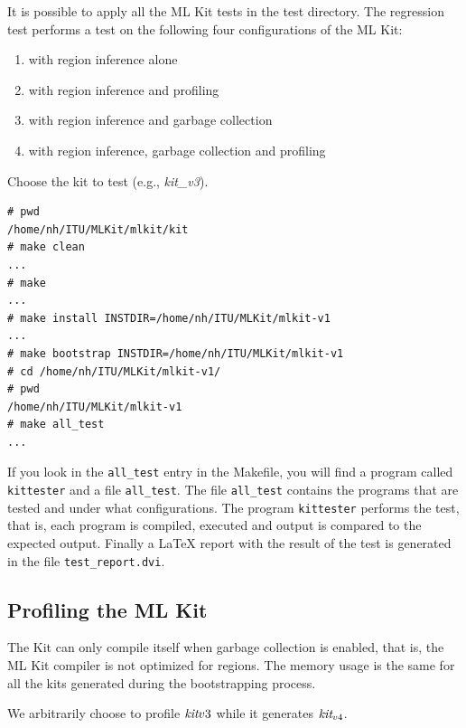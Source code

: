 \documentclass[12pt]{book}
\begin{document}
It is possible to apply all the ML Kit tests in the test directory.
The regression test performs a test on the following four
configurations of the ML Kit:

\begin{enumerate}
\item with region inference alone
\item with region inference and profiling
\item with region inference and garbage collection
\item with region inference, garbage collection and profiling
\end{enumerate}

Choose the kit to test (e.g., \emph{kit\_v3}).

\begin{verbatim}
# pwd
/home/nh/ITU/MLKit/mlkit/kit
# make clean
...
# make
...
# make install INSTDIR=/home/nh/ITU/MLKit/mlkit-v1
...
# make bootstrap INSTDIR=/home/nh/ITU/MLKit/mlkit-v1
# cd /home/nh/ITU/MLKit/mlkit-v1/
# pwd
/home/nh/ITU/MLKit/mlkit-v1
# make all_test
...
\end{verbatim}

If you look in the \texttt{all\_test} entry in the Makefile, you will
find a program called \texttt{kittester} and a file
\texttt{all\_test}. The file \texttt{all\_test} contains the programs
that are tested and under what configurations. The program
\texttt{kittester} performs the test, that is, each program is
compiled, executed and output is compared to the expected output.
Finally a \LaTeX{} report with the result of the test is generated in
the file \texttt{test\_report.dvi}.

\subsection{Profiling the ML Kit}

The Kit can only compile itself when garbage collection is enabled,
that is, the ML Kit compiler is not optimized for regions. The memory
usage is the same for all the kits generated during the bootstrapping
process.

We arbitrarily choose to profile $\emph{kit}{v3}$ while it generates
$\emph{kit}_{v4}$.

\begin{verbatim}
\end{verbatim}



\end{document}
